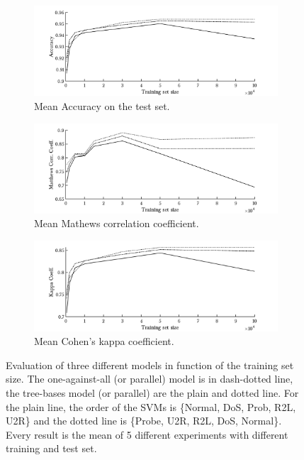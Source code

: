\begin{figure}
        \begin{subfigure}[b]{1\textwidth}  
            \centering 
            \includegraphics[width=.98\textwidth]{parts/chap-4/img-svm/lin-svm-1.png}
            \caption{Mean Accuracy on the test set.} 
        \end{subfigure}
        \vfill
        \begin{subfigure}[b]{1\textwidth}   
            \centering 
            \includegraphics[width=.98\textwidth]{parts/chap-4/img-svm/lin-svm-2.png}
            \caption{Mean Mathews correlation coefficient.} 
        \end{subfigure}
        \vfill
        \begin{subfigure}[b]{1\textwidth}   
            \centering 
            \includegraphics[width=.98\textwidth]{parts/chap-4/img-svm/lin-svm-3.png}
            \caption{Mean Cohen's kappa coefficient.} 
        \end{subfigure}
        \caption{Evaluation of three different models in function of the training set size. The one-against-all (or parallel) model is in dash-dotted line, the tree-bases model (or parallel) are the plain and dotted line. For the plain line, the order of the SVMs is \{Normal, DoS, Prob, R2L, U2R\} and the dotted line is \{Probe, U2R, R2L, DoS, Normal\}. Every result is the mean of 5 different experiments with different training and test set.}
        \label{fig:svm-l}
\end{figure}

